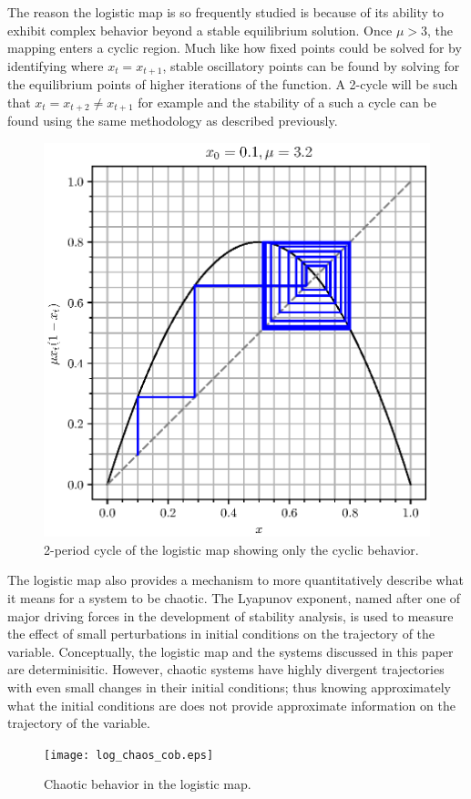 The reason the logistic map is so frequently studied is because of its ability to exhibit complex behavior beyond a stable equilibrium solution. Once $\mu>3$, the mapping enters a cyclic region. Much like how fixed points could be solved for by identifying where $x_{t}=x_{t+1}$, stable oscillatory points can be found by solving for the equilibrium points of higher iterations of the function. A 2-cycle will be such that $x_{t}=x_{t+2}\neq x_{t+1}$ for example and the stability of a such a cycle can be found using the same methodology as described previously. 
\begin{figure}
    \centering
    \includegraphics[height=0.4\textheight]{log_cyclic_cob.eps}
    \caption{2-period cycle of the logistic map showing only the cyclic behavior.}
    \label{log_cyclic_cob}
\end{figure}
The logistic map also provides a mechanism to more quantitatively describe what it means for a system to be chaotic. The Lyapunov exponent, named after one of major driving forces in the development of stability analysis, is used to measure the effect of small perturbations in initial conditions on the trajectory of the variable\autocite{Puu2003}. Conceptually, the logistic map and the systems discussed in this paper are determinisitic. However, chaotic systems have highly divergent trajectories with even small changes in their initial conditions; thus knowing approximately what the initial conditions are does not provide approximate information on the trajectory of the variable. 
\begin{figure}
    \centering
    \texttt{[image: log\_chaos\_cob.eps]}
    \caption{Chaotic behavior in the logistic map.}
    \label{log_chaos_cob}
\end{figure}

